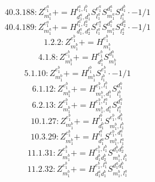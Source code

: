 \documentclass[letterpaper,10pt,fleqn,leqno,onecolumn]{article}
\begin{document}
\begin{equation} \;\;\;\;\;\;  40.3.188: Z^{e_{1}^{a}}_{m_{1}^{a}}+=H^{l_{1}^{a},l_{1}^{b}}_{d_{1}^{a},d_{1}^{b}}S^{e_{1}^{a}}_{l_{1}^{a}}S^{d_{1}^{a}}_{m_{1}^{a}}S^{d_{1}^{b}}_{l_{1}^{b}}\cdot -1/1 \end{equation}
\begin{equation} \;\;\;\;\;\;  40.4.189: Z^{e_{1}^{a}}_{m_{1}^{a}}+=H^{l_{1}^{a},l_{2}^{a}}_{d_{1}^{a},d_{2}^{a}}S^{e_{1}^{a}}_{l_{1}^{a}}S^{d_{1}^{a}}_{m_{1}^{a}}S^{d_{2}^{a}}_{l_{2}^{a}}\cdot -1/1 \end{equation}
\begin{equation} \;\;\;\;\;\;  1.2.2: Z^{e_{1}^{b}}_{m_{1}^{b}}+=H^{e_{1}^{b}}_{m_{1}^{b}} \end{equation}
\begin{equation} \;\;\;\;\;\;  4.1.8: Z^{e_{1}^{b}}_{m_{1}^{b}}+=H^{e_{1}^{b}}_{d_{1}^{b}}S^{d_{1}^{b}}_{m_{1}^{b}} \end{equation}
\begin{equation} \;\;\;\;\;\;  5.1.10: Z^{e_{1}^{b}}_{m_{1}^{b}}+=H^{l_{1}^{b}}_{m_{1}^{b}}S^{e_{1}^{b}}_{l_{1}^{b}}\cdot -1/1 \end{equation}
\begin{equation} \;\;\;\;\;\;  6.1.12: Z^{e_{1}^{b}}_{m_{1}^{b}}+=H^{e_{1}^{b},l_{1}^{b}}_{m_{1}^{b},d_{1}^{b}}S^{d_{1}^{b}}_{l_{1}^{b}} \end{equation}
\begin{equation} \;\;\;\;\;\;  6.2.13: Z^{e_{1}^{b}}_{m_{1}^{b}}+=H^{e_{1}^{b},l_{1}^{a}}_{m_{1}^{b},d_{1}^{a}}S^{d_{1}^{a}}_{l_{1}^{a}} \end{equation}
\begin{equation} \;\;\;\;\;\;  10.1.27: Z^{e_{1}^{b}}_{m_{1}^{b}}+=H^{l_{1}^{b}}_{d_{1}^{b}}S^{e_{1}^{b},d_{1}^{b}}_{m_{1}^{b},l_{1}^{b}} \end{equation}
\begin{equation} \;\;\;\;\;\;  10.3.29: Z^{e_{1}^{b}}_{m_{1}^{b}}+=H^{l_{1}^{a}}_{d_{1}^{a}}S^{e_{1}^{b},d_{1}^{a}}_{m_{1}^{b},l_{1}^{a}} \end{equation}
\begin{equation} \;\;\;\;\;\;  11.1.31: Z^{e_{1}^{b}}_{m_{1}^{b}}+=H^{e_{1}^{b},l_{1}^{b}}_{d_{1}^{b}d_{2}^{b}}S^{d_{1}^{b}d_{2}^{b}}_{m_{1}^{b},l_{1}^{b}} \end{equation}
\begin{equation} \;\;\;\;\;\;  11.2.32: Z^{e_{1}^{b}}_{m_{1}^{b}}+=H^{e_{1}^{b},l_{1}^{a}}_{d_{1}^{a}d_{1}^{b}}S^{d_{1}^{a}d_{1}^{b}}_{m_{1}^{b},l_{1}^{a}} \end{equation}
\end{document}
